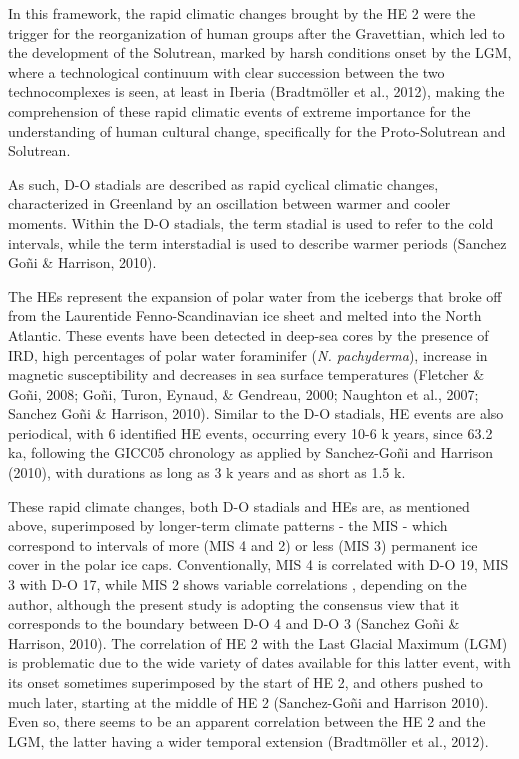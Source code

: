 \documentclass[12pt,twoside]{reedthesis}
\begin{document}
In this framework, the rapid climatic changes brought by the HE 2 were the trigger for the reorganization of human groups after the Gravettian, which led to the development of the Solutrean, marked by harsh conditions onset by the LGM, where a technological continuum with clear succession between the two technocomplexes is seen, at least in Iberia (Bradtmöller et al., 2012), making the comprehension of these rapid climatic events of extreme importance for the understanding of human cultural change, specifically for the Proto-Solutrean and Solutrean.

As such, D-O stadials are described as rapid cyclical climatic changes, characterized in Greenland by an oscillation between warmer and cooler moments. Within the D-O stadials, the term stadial is used to refer to the cold intervals, while the term interstadial is used to describe warmer periods (Sanchez Goñi \& Harrison, 2010).

The HEs represent the expansion of polar water from the icebergs that broke off from the Laurentide Fenno-Scandinavian ice sheet and melted into the North Atlantic. These events have been detected in deep-sea cores by the presence of IRD, high percentages of polar water foraminifer (\emph{N. pachyderma}), increase in magnetic susceptibility and decreases in sea surface temperatures (Fletcher \& Goñi, 2008; Goñi, Turon, Eynaud, \& Gendreau, 2000; Naughton et al., 2007; Sanchez Goñi \& Harrison, 2010). Similar to the D-O stadials, HE events are also periodical, with 6 identified HE events, occurring every 10-6 k years, since 63.2 ka, following the GICC05 chronology as applied by Sanchez-Goñi and Harrison (2010), with durations as long as 3 k years and as short as 1.5 k.

These rapid climate changes, both D-O stadials and HEs are, as mentioned above, superimposed by longer-term climate patterns - the MIS - which correspond to intervals of more (MIS 4 and 2) or less (MIS 3) permanent ice cover in the polar ice caps. Conventionally, MIS 4 is correlated with D-O 19, MIS 3 with D-O 17, while MIS 2 shows variable correlations , depending on the author, although the present study is adopting the consensus view that it corresponds to the boundary between D-O 4 and D-O 3 (Sanchez Goñi \& Harrison, 2010).
The correlation of HE 2 with the Last Glacial Maximum (LGM) is problematic due to the wide variety of dates available for this latter event, with its onset sometimes superimposed by the start of HE 2, and others pushed to much later, starting at the middle of HE 2 (Sanchez-Goñi and Harrison 2010). Even so, there seems to be an apparent correlation between the HE 2 and the LGM, the latter having a wider temporal extension (Bradtmöller et al., 2012).
\end{document}
